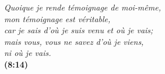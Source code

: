 \newpage
\mbox{}
\vfill


\begin{myverse}
{\itshape
\Og{}Quoique je rende témoignage de moi-même, \\
 mon témoignage est véritable, \\
 car je sais d’où je suis venu et où je vais; \\
 mais vous, vous ne savez d’où je viens, \\
 ni où je vais.\Fg{} \\[5mm]
}
\myversereffont\bfseries\scshape {}(8:14)
\end{myverse}
\vfill
\mbox{}
\newpage
